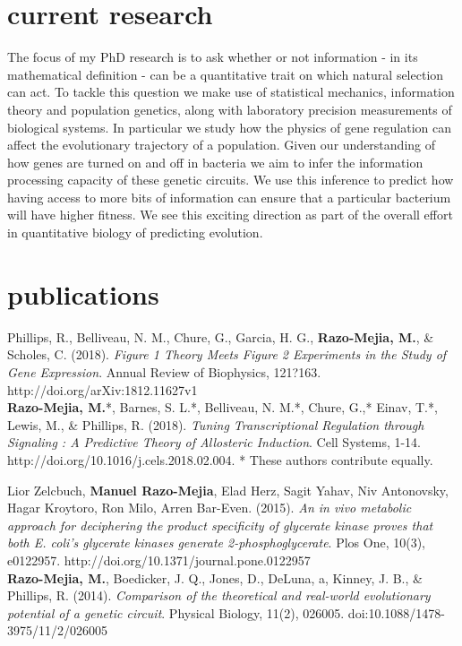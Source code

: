 \documentclass[]{friggeri-cv}
\begin{document}
\section{current research}

The focus of my PhD research is to ask whether or not information - in its mathematical definition - can be a quantitative trait on which natural selection can act. To tackle this question we make use of statistical mechanics, information theory and population genetics, along with laboratory precision measurements of biological systems. In particular we study how the physics of gene regulation can affect the evolutionary trajectory of a population. Given our understanding of how genes are turned on and off in bacteria we aim to infer the information processing capacity of these genetic circuits. We use this inference to predict how having access to more bits of information can ensure that a particular bacterium will have higher fitness. We see this exciting direction as part of the overall effort in quantitative biology of predicting evolution.

\section{publications}

Phillips, R., Belliveau, N. M., Chure, G., Garcia, H. G., \textbf{Razo-Mejia, M.}, \& Scholes, C. (2018). \textit{Figure 1 Theory Meets Figure 2 Experiments in the Study of Gene Expression}. Annual Review of Biophysics, 121?163. http://doi.org/arXiv:1812.11627v1\\

\textbf{Razo-Mejia, M.}*, Barnes, S. L.*, Belliveau, N. M.*, Chure, G.,* Einav, T.*, Lewis, M., \& Phillips, R. (2018). \textit{Tuning Transcriptional Regulation through Signaling : A Predictive Theory of Allosteric Induction}. Cell Systems, 1-14. http://doi.org/10.1016/j.cels.2018.02.004. * These authors contribute equally.

Lior Zelcbuch, \textbf{Manuel Razo-Mejia}, Elad Herz, Sagit Yahav, Niv Antonovsky, Hagar Kroytoro, Ron Milo, Arren Bar-Even. (2015). \textit{An in vivo metabolic approach for deciphering the product specificity of glycerate kinase proves that both E. coli's glycerate kinases generate 2-phosphoglycerate}. Plos One, 10(3), e0122957. http://doi.org/10.1371/journal.pone.0122957\\

\textbf{Razo-Mejia, M.}, Boedicker, J. Q., Jones, D., DeLuna, a, Kinney, J. B., \& Phillips, R. (2014). \textit{Comparison of the theoretical and real-world evolutionary potential of a genetic circuit}. Physical Biology, 11(2), 026005. doi:10.1088/1478-3975/11/2/026005\\
\end{document}
